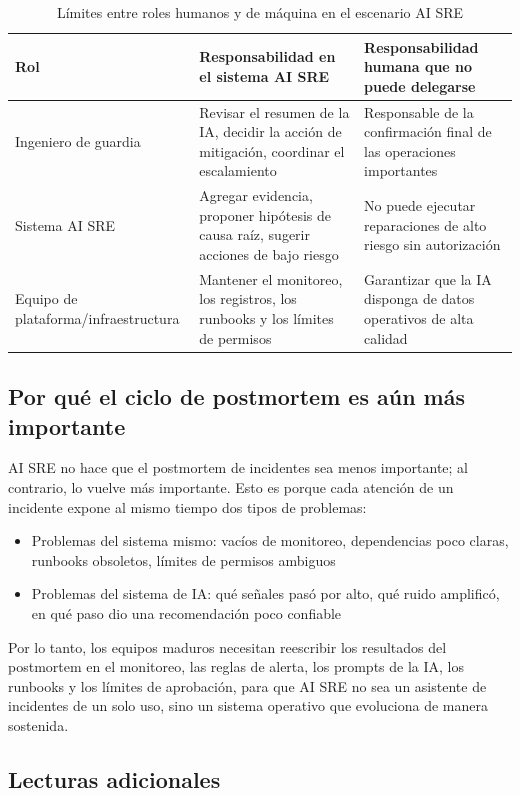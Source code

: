 \documentclass[a4paper]{article}
\begin{document}
\begin{table}[H]
\centering
\begin{tabular}{p{} p{} p{}}
\toprule
Rol & Responsabilidad en el sistema AI SRE & Responsabilidad humana que no puede delegarse \\
\midrule
Ingeniero de guardia & Revisar el resumen de la IA, decidir la acción de mitigación, coordinar el escalamiento & Responsable de la confirmación final de las operaciones importantes \\
Sistema AI SRE & Agregar evidencia, proponer hipótesis de causa raíz, sugerir acciones de bajo riesgo & No puede ejecutar reparaciones de alto riesgo sin autorización \\
Equipo de plataforma/infraestructura & Mantener el monitoreo, los registros, los runbooks y los límites de permisos & Garantizar que la IA disponga de datos operativos de alta calidad \\
\bottomrule
\end{tabular}
\caption{Límites entre roles humanos y de máquina en el escenario AI SRE}
\end{table}

\subsection{Por qué el ciclo de postmortem es aún más importante}

AI SRE no hace que el postmortem de incidentes sea menos importante; al contrario, lo vuelve más importante. Esto es porque cada atención de un incidente expone al mismo tiempo dos tipos de problemas:

\begin{itemize}
    \item Problemas del sistema mismo: vacíos de monitoreo, dependencias poco claras, runbooks obsoletos, límites de permisos ambiguos
    \item Problemas del sistema de IA: qué señales pasó por alto, qué ruido amplificó, en qué paso dio una recomendación poco confiable
\end{itemize}

Por lo tanto, los equipos maduros necesitan reescribir los resultados del postmortem en el monitoreo, las reglas de alerta, los prompts de la IA, los runbooks y los límites de aprobación, para que AI SRE no sea un asistente de incidentes de un solo uso, sino un sistema operativo que evoluciona de manera sostenida.

\subsection{Lecturas adicionales}
\end{document}
